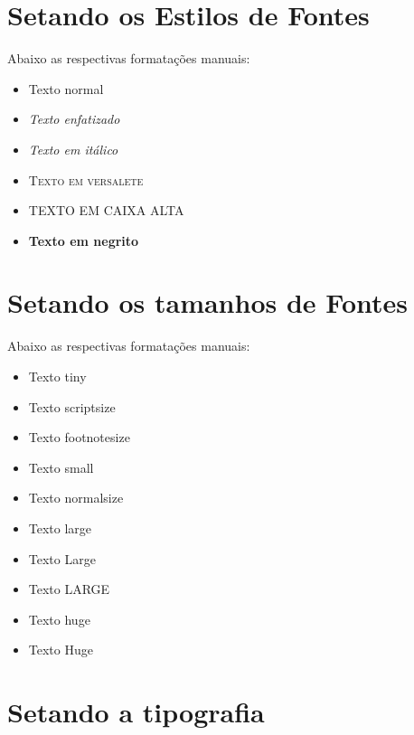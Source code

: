     \section{Setando os Estilos de  Fontes}

    Abaixo as respectivas formatações manuais:

    \begin{itemize}

        \item \textnormal{Texto normal}
        \item \emph{Texto enfatizado}
        \item \textit{Texto em itálico}
        \item \textsc{Texto em versalete}
        \item \uppercase{Texto em caixa alta}
        \item \textbf{Texto em negrito}

    \end{itemize}

    \section{Setando os tamanhos de Fontes}

    Abaixo as respectivas formatações manuais:

    \begin{itemize}

        \item {\tiny Texto tiny}
        \item {\scriptsize Texto scriptsize}
        \item {\footnotesize Texto footnotesize}
        \item {\small Texto small}
        \item {\normalsize Texto normalsize}
        \item {\large Texto large}
        \item {\Large Texto Large}
        \item {\LARGE Texto LARGE}
        \item {\huge Texto huge}
        \item {\Huge Texto Huge}

    \end{itemize}

    \section{Setando a tipografia}

